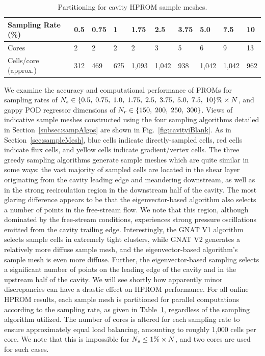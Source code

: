 \begin{table}
	\centering
	\begin{tabular}{ llllllllll }
	\toprule
	Sampling Rate (\%) & 0.5 & 0.75 & 1 & 1.75 & 2.5 & 3.75 & 5.0 & 7.5 & 10 \\
	\midrule
	Cores & 2 & 2 & 2 & 2 & 3 & 5 & 6 & 9 & 13 \\
	Cells/core (approx.) & 312 & 469 & 625 & 1,093 & 1,042 & 938 & 1,042 & 1,042 & 962 \\
	\bottomrule
	\end{tabular}
	\caption{\label{tab:cavitySampProcs}Partitioning for cavity HPROM sample meshes.}
\end{table}

We examine the accuracy and computational performance of PROMs for sampling rates of $N_s \in \{0.5, \; 0.75, \; 1.0, \; 1.75, \; 2.5, \; 3.75, \; 5.0, \; 7.5, \; 10\}\% \times N$, and gappy POD regressor dimensions of $N_r \in \{150, \; 200, \; 250, \; 300\}$. Views of indicative sample meshes constructed using the four sampling algorithms detailed in Section~\ref{subsec:sampAlgos} are shown in Fig.~\ref{fig:cavityiBlank}. As in Section~\ref{sec:sampleMesh}, blue cells indicate directly-sampled cells, red cells indicate flux cells, and yellow cells indicate gradient/vertex cells. The three greedy sampling algorithms generate sample meshes which are quite similar in some ways: the vast majority of sampled cells are located in the shear layer originating from the cavity leading edge and meandering downstream, as well as in the strong recirculation region in the downstream half of the cavity. The most glaring difference appears to be that the eigenvector-based algorithm also selects a number of points in the free-stream flow. We note that this region, although dominated by the free-stream conditions, experiences strong pressure oscillations emitted from the cavity trailing edge. Interestingly, the GNAT V1 algorithm selects sample cells in extremely tight clusters, while GNAT V2 generates a relatively more diffuse sample mesh, and the eigenvector-based algorithm's sample mesh is even more diffuse. Further, the eigenvector-based sampling selects a significant number of points on the leading edge of the cavity and in the upstream half of the cavity. We will see shortly how apparently minor discrepancies can have a drastic effect on HPROM performance. For all online HPROM results, each sample mesh is partitioned for parallel computations according to the sampling rate, as given in Table~\ref{tab:cavitySampProcs}, regardless of the sampling algorithm utilized. The number of cores is altered for each sampling rate to ensure approximately equal load balancing, amounting to roughly 1,000 cells per core. We note that this is impossible for $N_s \le 1\% \times N$, and two cores are used for such cases.

